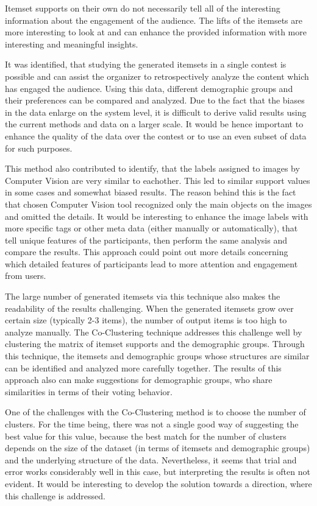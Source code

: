 Itemset supports on their own do not necessarily tell all of the interesting information about the engagement of the audience. The lifts of the itemsets are more interesting to look at and can enhance the provided information with more interesting and meaningful insights. 

It was identified, that studying the generated itemsets in a single contest is possible and can assist the organizer to retrospectively analyze the content which has engaged the audience. Using this data, different demographic groups and their preferences can be compared and analyzed. Due to the fact that the biases in the data enlarge on the system level, it is difficult to derive valid results using the current methods and data on a larger scale. It would be hence important to enhance the quality of the data over the contest or to use an even subset of data for such purposes.

This method also contributed to identify, that the labels assigned to images by Computer Vision are very similar to eachother. This led to similar support values in some cases and somewhat biased results. The reason behind this is the fact that chosen Computer Vision tool recognized only the main objects on the images and omitted the details. It would be interesting to enhance the image labels with more specific tags or other meta data (either manually or automatically), that tell unique features of the participants, then perform the same analysis and compare the results. This approach could point out more details concerning which detailed features of participants lead to more attention and engagement from users.

The large number of generated itemsets via this technique also makes the readability of the results challenging. When the generated itemsets grow over certain size (typically 2-3 items), the number of output items is too high to analyze manually. The Co-Clustering technique addresses this challenge well by clustering the matrix of itemset supports and the demographic groups. Through this technique, the itemsets and demographic groups whose structures are similar can be identified and analyzed more carefully together. The results of this approach also can make suggestions for demographic groups, who share similarities in terms of their voting behavior.

One of the challenges with the Co-Clustering method is to choose the number of clusters. For the time being, there was not a single good way of suggesting the best value for this value, because the best match for the number of clusters depends on the size of the dataset (in terms of itemsets and demographic groups) and the underlying structure of the data. Nevertheless, it seems that trial and error works considerably well in this case, but interpreting the results is often not evident. It would be interesting to develop the solution towards a direction, where this challenge is addressed.

